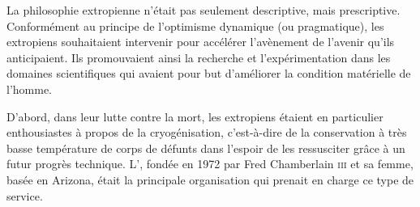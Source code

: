 La philosophie extropienne n'était pas seulement descriptive, mais prescriptive. Conformément au principe de l'optimisme dynamique (ou pragmatique), les extropiens souhaitaient intervenir pour accélérer l'avènement de l'avenir qu'ils anticipaient. Ils promouvaient ainsi la recherche et l'expérimentation dans les domaines scientifiques qui avaient pour but d'améliorer la condition matérielle de l'homme.

D'abord, dans leur lutte contre la mort, les extropiens étaient en particulier enthousiastes à propos de la cryogénisation, c'est-à-dire de la conservation à très basse température de corps de défunts dans l'espoir de les ressusciter grâce à un futur progrès technique. L', fondée en 1972 par Fred Chamberlain \textsc{iii} et sa femme, basée en Arizona, était la principale organisation qui prenait en charge ce type de service.

